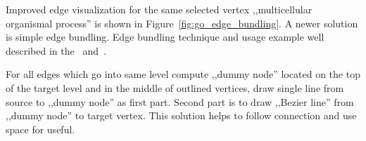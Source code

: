 Improved edge visualization for the same selected vertex ,,multicellular organismal process'' is shown in Figure~\ref{fig:go_edge_bundling}. A newer solution is simple edge bundling. Edge bundling technique and usage example well described in the~\cite{EDGE_BUNDLING_1} and~\cite{EDGE_BUNDLING_2}.

For all edges which go into same level compute ,,dummy node'' located on the top of the target level and in the middle of outlined vertices, draw single line from source to ,,dummy node'' as first part. Second part is to draw ,,Bezier line'' from ,,dummy node'' to target vertex. This solution helps to follow connection and use space for useful. 